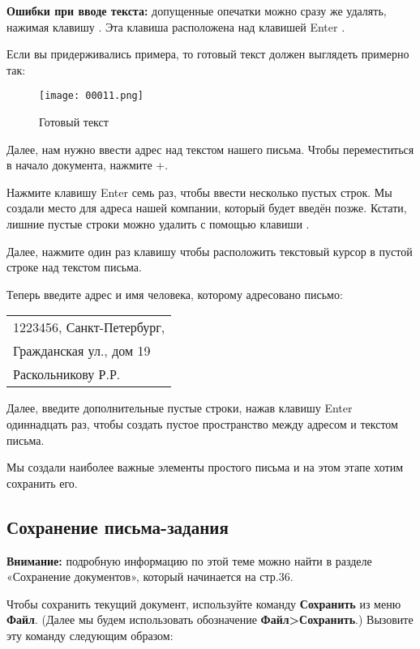 \documentclass[a4paper,10pt]{article}
\begin{document}
\textbf{Ошибки при вводе текста:} допущенные опечатки можно сразу же удалять, нажимая клавишу . Эта клавиша расположена над клавишей Enter \keys{\return}.

Если вы придерживались примера, то готовый текст должен выглядеть примерно так:

\begin{figure}[ht]
\texttt{[image: 00011.png]}
\centering
\caption{Готовый текст}
\end{figure}

Далее, нам нужно ввести адрес над текстом нашего письма. Чтобы переместиться в начало документа, нажмите +.

Нажмите клавишу Enter \keys{\return} семь раз, чтобы ввести несколько пустых строк. Мы создали место для адреса нашей компании, который будет введён позже. Кстати, лишние пустые строки можно удалить с помощью клавиши .

Далее, нажмите один раз клавишу \keys{\arrowkeyup} чтобы расположить текстовый курсор в пустой строке над текстом письма.

Теперь введите адрес и имя человека, которому адресовано письмо:

\begin{center}
\begin{tabular}{ | m{15cm} | }
\hline
1223456, Санкт-Петербург, \keys{\return} \\
Гражданская ул., дом 19\keys{\return} \\
Раскольникову Р.Р.\keys{\return} \\
\hline
\end{tabular}
\end{center}

Далее, введите дополнительные пустые строки, нажав клавишу Enter \keys{\return} одиннадцать раз, чтобы создать пустое пространство между адресом и текстом письма.

Мы создали наиболее важные элементы простого письма и на этом этапе хотим сохранить его.

\subsection{Сохранение письма-задания}
\textbf{Внимание:} подробную информацию по этой теме можно найти в разделе «Сохранение документов», который начинается на стр.36.

Чтобы сохранить текущий документ, используйте команду \textbf{Сохранить} из меню \textbf{Файл}. (Далее мы будем использовать обозначение \textbf{Файл>Сохранить}.) Вызовите эту команду следующим образом:
\end{document}
